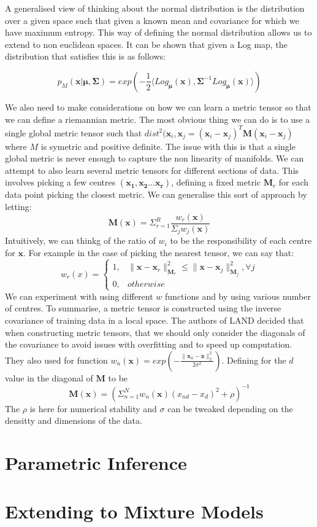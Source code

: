 \documentclass{article}
\begin{document}
A generalised view of thinking about the normal distribution is the distribution over a given space such that given a known mean and covariance for which we have maximum entropy.
This way of defining the normal distribution allows us to extend to non euclidean spaces.
It can be shown that given a Log map, the distribution that satisfies this is as follows:

$$p_M(\bm{x}|\bm{\mu},\bm{\Sigma}) = exp(-\frac{1}{2}\langle Log_{\bm{\mu}}(\bm{x}),
\bm{\Sigma}^{-1}Log_{\bm{\mu}}(\bm{x})\rangle)$$

We also need to make considerations on how we can learn a metric tensor so that we can define a riemannian metric.
The most obvious thing we can do is to use a single global metric tensor such that $dist^2(\bm{x}_i, \bm{x}_j = (\bm{x}_i-\bm{x}_j)^T\bm{M}(\bm{x}_i-\bm{x}_j)$ where $M$ is symetric and positive definite.
The issue with this is that a single global metric is never enough to capture the non linearity of manifolds.
We can attempt to also learn several metric tensors for different sections of data.
This involves picking a few centres $(\bm{x_1}, \bm{x_2} ... \bm{x_r})$, defining a fixed metric $\bm{M}_r$ for each data point picking the closest metric.
We can generalise this sort of approach by letting:
$$\bm{M}(\bm{x}) = \Sigma_{r=1}^R\frac{w_r(\bm{x})}{\Sigma_jw_j(\bm{x})}$$
Intuitively, we can thinkg of the ratio of $w_i$ to be the responsibility of each centre for $\bm{x}$.
For example in the case of picking the nearest tensor, we can say that:
$$w_r(x) = \begin{cases} 1,&\|\bm{x}-\bm{x}_r\|_{\bm{M}_r}^2 \leq \|\bm{x}-\bm{x}_j\|_{\bm{M}_j}^2, \forall j \\
0,& otherwise\end{cases}$$
We can experiment with using different $w$ functions and by using various number of centres.
To summarise, a metric tensor is constructed using the inverse covariance of training data in a local space.
The authors of LAND decided that when constructing metric tensors, that we should only consider the diagonals of the covariance to avoid issues with overfitting and to speed up computation.
They also used for function $w_n(\bm{x}) = exp(-\frac{\|\bm{x}_n-\bm{x}\|_2^2}{2\sigma^2})$.
Defining for the $d$ value in the diagonal of $\bm{M}$ to be $$\bm{M}(\bm{x}) = (\Sigma_{n=1}^Nw_n(\bm{x})(x_{nd}-x_d)^2+\rho)^{-1}$$
The $\rho$ is here for numerical stability and $\sigma$ can be tweaked depending on the densitty and dimensions of the data.
\section{Parametric Inference}
\section{Extending to Mixture Models}
\end{document}
